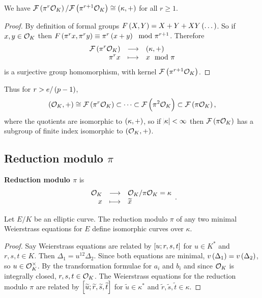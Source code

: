\begin{lemma}
We have $ \FFF\br{\pi^r\OOO_K} / \FFF\br{\pi^{r + 1}\OOO_K} \cong \br{\kappa, +} $ for all $ r \ge 1 $.
\end{lemma}

\begin{proof}
By definition of formal groups $ F\br{X, Y} = X + Y + XY\br{\dots} $. So if $ x, y \in \mathcal{O}_K $ then $ F\br{\pi^rx, \pi^ry} \equiv \pi^r\br{x + y} \mod \pi^{r + 1} $. Therefore
$$ \function{\FFF\br{\pi^r\OOO_K}}{\br{\kappa, +}}{\pi^rx}{x \mod \pi} $$
is a surjective group homomorphism, with kernel $ \FFF\br{\pi^{r + 1}\OOO_K} $.
\end{proof}

Thus for $ r > e / \br{p - 1} $,
$$ \br{\OOO_K, +} \cong \FFF\br{\pi^r\OOO_K} \subset \dots \subset \FFF\br{\pi^2\OOO_K} \subset \FFF\br{\pi\OOO_K}, $$
where the quotients are isomorphic to $ \br{\kappa, +} $, so if $ \abs{\kappa} < \infty $ then $ \FFF\br{\pi\OOO_K} $ has a subgroup of finite index isomorphic to $ \br{\OOO_K, +} $.

\subsection{Reduction modulo \texorpdfstring{$ \pi $}{p}}

\begin{notation*}
\textbf{Reduction modulo $ \pi $} is
$$ \function{\OOO_K}{\OOO_K / \pi\OOO_K = \kappa}{x}{\widetilde{x}}. $$
\end{notation*}

\begin{proposition}
Let $ E / K $ be an elliptic curve. The reduction modulo $ \pi $ of any two minimal Weierstrass equations for $ E $ define isomorphic curves over $ \kappa $.
\end{proposition}

\begin{proof}
Say Weierstrass equations are related by $ \sbr{u; r, s, t} $ for $ u \in K^* $ and $ r, s, t \in K $. Then $ \Delta_1 = u^{12}\Delta_2 $. Since both equations are minimal, $ v\br{\Delta_1} = v\br{\Delta_2} $, so $ u \in \mathcal{O}_K^\times $. By the transformation formulae for $ a_i $ and $ b_i $ and since $ \mathcal{O}_K $ is integrally closed, $ r, s, t \in \mathcal{O}_K $. The Weierstrass equations for the reduction modulo $ \pi $ are related by $ \sbr{\widetilde{u}; \widetilde{r}, \widetilde{s}, \widetilde{t}} $ for $ \widetilde{u} \in \kappa^* $ and $ \widetilde{r}, \widetilde{s}, \widetilde{t} \in \kappa $.
\end{proof}


